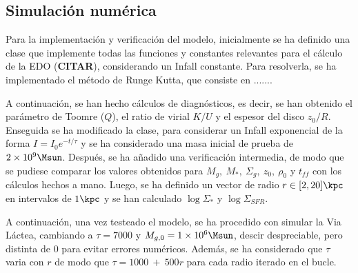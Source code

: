 \subsection{Simulación numérica}
Para la implementación y verificación del modelo, inicialmente se ha definido una clase que implemente todas las funciones y constantes relevantes para el cálculo de la EDO (\textbf{CITAR}), considerando un Infall constante. Para resolverla, se ha implementado el método de Runge Kutta, que consiste en .......

A continuación, se han hecho cálculos de diagnósticos, es decir, se han obtenido el parámetro de Toomre ($Q$), el ratio de virial $K/U$ y el espesor del disco $z_0/R$. Enseguida se ha modificado la clase, para considerar un Infall exponencial de la forma $I = I_0e^{-t/\tau}$ y se ha considerado una masa inicial de prueba de $2 \times 10^9 \unit{\Msun}$. Después, se ha añadido una verificación intermedia, de modo que se pudiese comparar los valores obtenidos para $M_g, \ M_{*}, \ \Sigma_g, \ z_0, \ \rho_0$ y $t_{ff}$ con los cálculos hechos a mano. Luego, se ha definido un vector de radio $r \in [2,20] \unit{\kpc}$ en intervalos de $1 \unit{\kpc}$ y se han calculado $\log\Sigma_{*} $ y $\log\Sigma_{SFR}$.

A continuación, una vez testeado el modelo, se ha procedido con simular la Via Láctea, cambiando a $\tau = 7000$ y $M_{g,0} = 1 \times 10^6 \unit{\Msun}$, descir despreciable, pero distinta de 0 para evitar errores numéricos. Además, se ha considerado que $\tau$ varia con $r$ de modo que $\tau = 1000 \ + \ 500r$ para cada radio iterado en el bucle.

